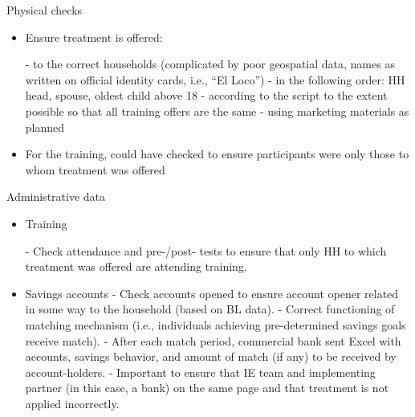 \documentclass[aspectratio=169]{beamer}
\begin{document}
\begin{frame}{Physical checks}

\begin{itemize}[<default overlay specification>]
	\item<1>   Ensure treatment is offered:

		\leavevmode 		\newline - to the correct households (complicated by poor geospatial data, names as written on official identity cards, i.e., “El Loco”)
		\newline - in the following order: HH head, spouse, oldest child above 18
		\newline -  according to the script to the extent possible so that all training offers are the same
		\newline - using marketing materials as planned
	\item<1> For the training, could have checked to ensure participants were only those to whom treatment was offered
\end{itemize}

\end{frame}


\begin{frame}{Administrative data}

\begin{itemize}[<default overlay specification>]
	\item<1>   Training

	\leavevmode 		\newline - Check attendance and pre-/post- tests to ensure that only HH to which treatment was offered are attending training.
	\item<1> Savings accounts
		\newline - Check accounts opened to ensure account opener related in some way to the household (based on BL data).
		\newline -  Correct functioning of matching mechanism (i.e., individuals achieving pre-determined savings goals receive match).
		\newline - After each match period, commercial bank sent Excel with accounts, savings behavior, and amount of match (if any) to be received by account-holders.
		\newline - Important to ensure that IE team and implementing partner (in this case, a bank) on the same page and that treatment is not applied incorrectly.
\end{itemize}

\end{frame}
\end{document}

